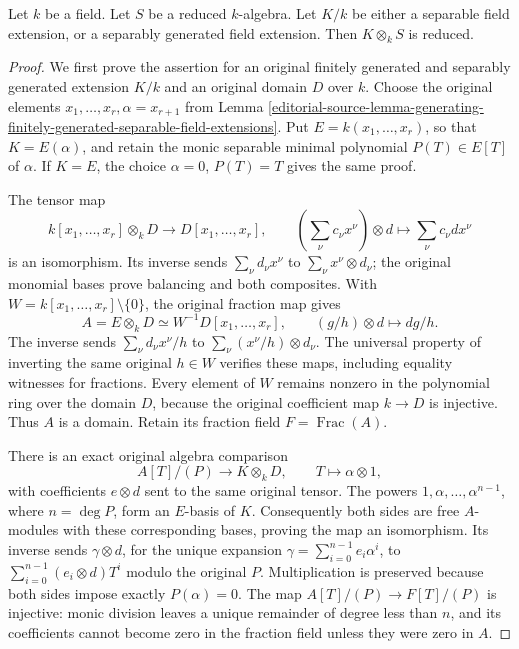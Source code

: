 \begin{lemma}
\label{editorial-source-lemma-separable-extension-preserves-reducedness}
Let $k$ be a field.
Let $S$ be a reduced $k$-algebra.
Let $K/k$ be either a separable field extension,
or a separably generated field extension.
Then $K \otimes_k S$ is reduced.
\end{lemma}

\begin{proof}
We first prove the assertion for an original
finitely generated and separably generated
extension $K/k$ and an original domain $D$
over $k$. Choose the original elements
$x_1,\ldots,x_r,\alpha=x_{r+1}$ from
Lemma \ref{editorial-source-lemma-generating-finitely-generated-separable-field-extensions}.
Put $E=k(x_1,\ldots,x_r)$, so that
$K=E(\alpha)$, and retain the monic separable
minimal polynomial $P(T)\in E[T]$ of $\alpha$.
If $K=E$, the choice $\alpha=0$, $P(T)=T$
gives the same proof.

The tensor map
$$
k[x_1,\ldots,x_r]\otimes_kD
\longrightarrow D[x_1,\ldots,x_r],\qquad
\left(\sum_\nu c_\nu x^\nu\right)\otimes d
\longmapsto\sum_\nu c_\nu d x^\nu
$$
is an isomorphism. Its inverse sends
$\sum_\nu d_\nu x^\nu$ to
$\sum_\nu x^\nu\otimes d_\nu$; the original
monomial bases prove balancing and both
composites. With
$W=k[x_1,\ldots,x_r]\setminus\{0\}$,
the original fraction map gives
$$
A=E\otimes_kD\simeq W^{-1}D[x_1,\ldots,x_r],
\qquad (g/h)\otimes d\longmapsto dg/h.
$$
The inverse sends $\sum_\nu d_\nu x^\nu/h$
to $\sum_\nu(x^\nu/h)\otimes d_\nu$.
The universal property of inverting the
same original $h\in W$ verifies these maps,
including equality witnesses for fractions.
Every element of $W$ remains nonzero in the
polynomial ring over the domain $D$, because
the original coefficient map $k\to D$ is
injective. Thus $A$ is a domain. Retain its
fraction field $F=\operatorname{Frac}(A)$.

There is an exact original algebra comparison
$$
A[T]/(P)\longrightarrow K\otimes_kD,
\qquad T\longmapsto\alpha\otimes1,
$$
with coefficients $e\otimes d$ sent to the
same original tensor. The powers
$1,\alpha,\ldots,\alpha^{n-1}$, where
$n=\deg P$, form an $E$-basis of $K$.
Consequently both sides are free $A$-modules
with these corresponding bases, proving the
map an isomorphism. Its inverse sends
$\gamma\otimes d$, for the unique expansion
$\gamma=\sum_{i=0}^{n-1}e_i\alpha^i$, to
$\sum_{i=0}^{n-1}(e_i\otimes d)T^i$ modulo
the original $P$. Multiplication is preserved
because both sides impose exactly $P(\alpha)=0$.
The map $A[T]/(P)\to F[T]/(P)$ is injective:
monic division leaves a unique remainder
of degree less than $n$, and its coefficients
cannot become zero in the fraction field
unless they were zero in $A$.


\end{proof}
